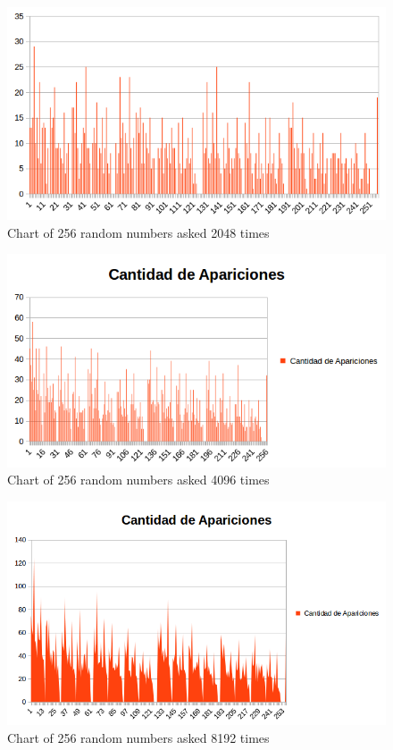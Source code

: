 \documentclass[twocolumn]{IEEEtran}
\begin{document}
\begin{enumerate}
	\begin{figure}[h!]
    \centering
    \includegraphics[width=\columnwidth]{src/256n2048v.png}
	\caption{Chart of 256 random numbers asked 2048 times}
    \label{fig:256n2048v}
    \end{figure}
    
    \begin{figure}[h!]
    \centering
    \includegraphics[width=\columnwidth]{src/256n4096v.png}
	\caption{Chart of 256 random numbers asked 4096 times}
    \label{fig:256n4096v}
    \end{figure}
    
    \begin{figure}[h!]
    \centering
    \includegraphics[width=\columnwidth]{src/256n8192v.png}
	\caption{Chart of 256 random numbers asked 8192 times}
    \label{fig:256n8192v}
    \end{figure}
    
	\end{enumerate}
\end{document}
